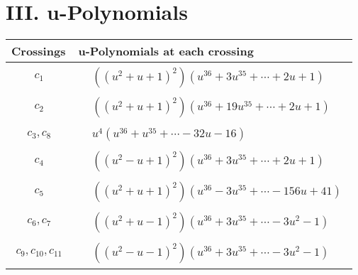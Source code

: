 \documentclass[1p]{elsarticle_modified}
\theoremstyle{definition}
\begin{document}
\newpage\renewcommand{\arraystretch}{1}
\centering \section*{ III. u-Polynomials}
\begin{tabular}{m{50pt}|m{274pt}}
Crossings & \hspace{64pt}u-Polynomials at each crossing \\
\hline $$\begin{aligned}c_{1}\end{aligned}$$&$\begin{aligned}
&((u^2+u+1)^2)(u^{36}+3 u^{35}+\cdots+2 u+1)
\end{aligned}$\\
\hline $$\begin{aligned}c_{2}\end{aligned}$$&$\begin{aligned}
&((u^2+u+1)^2)(u^{36}+19 u^{35}+\cdots+2 u+1)
\end{aligned}$\\
\hline $$\begin{aligned}c_{3},c_{8}\end{aligned}$$&$\begin{aligned}
&u^4(u^{36}+u^{35}+\cdots-32 u-16)
\end{aligned}$\\
\hline $$\begin{aligned}c_{4}\end{aligned}$$&$\begin{aligned}
&((u^2- u+1)^2)(u^{36}+3 u^{35}+\cdots+2 u+1)
\end{aligned}$\\
\hline $$\begin{aligned}c_{5}\end{aligned}$$&$\begin{aligned}
&((u^2+u+1)^2)(u^{36}-3 u^{35}+\cdots-156 u+41)
\end{aligned}$\\
\hline $$\begin{aligned}c_{6},c_{7}\end{aligned}$$&$\begin{aligned}
&((u^2+u-1)^2)(u^{36}+3 u^{35}+\cdots-3 u^2-1)
\end{aligned}$\\
\hline $$\begin{aligned}c_{9},c_{10},c_{11}\end{aligned}$$&$\begin{aligned}
&((u^2- u-1)^2)(u^{36}+3 u^{35}+\cdots-3 u^2-1)
\end{aligned}$\\
\hline
\end{tabular}\newpage\renewcommand{\arraystretch}{1}
\end{document}
